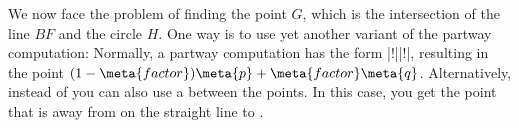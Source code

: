 \begin{codeexample}[]
\end{codeexample}

We now face the problem of finding the point $G$, which is the
intersection of the line $BF$ and the circle $H$. One way is to use
yet another variant of the partway computation: Normally, a partway
computation has the form |!||!|,
resulting in the point $(1-\meta{factor})\meta{p} +
\meta{factor}\meta{q}$. Alternatively, instead of  you
can also use a  between the points. In this case, you
get the point that is  away from  on the
straight line to .

